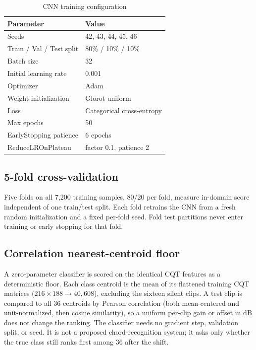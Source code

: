 \documentclass[pdflatex,sn-mathphys-num,iicol]{sn-jnl}
\theoremstyle{thmstyleone}
\theoremstyle{thmstyletwo}
\theoremstyle{thmstylethree}
\begin{document}
\begin{table}[t]
\caption{CNN training configuration}\label{tab:cnn-training-config}
\begin{tabular}{@{}ll@{}}
\toprule
Parameter & Value \\
\midrule
Seeds & 42, 43, 44, 45, 46 \\
Train / Val / Test split & 80\% / 10\% / 10\% \\
Batch size & 32 \\
Initial learning rate & 0.001 \\
Optimizer & Adam \\
Weight initialization & Glorot uniform \\
Loss & Categorical cross-entropy \\
Max epochs & 50 \\
EarlyStopping patience & 6 epochs \\
ReduceLROnPlateau & factor 0.1, patience 2 \\
\bottomrule
\end{tabular}
\end{table}

\subsection{5-fold cross-validation}\label{subsec3_5}

Five folds on all 7{,}200 training samples, 80/20 per fold, measure in-domain score independent of one train/test split. Each fold retrains the CNN from a fresh random initialization and a fixed per-fold seed. Fold test partitions never enter training or early stopping for that fold.

\subsection{Correlation nearest-centroid floor}\label{subsec3_baseline}

A zero-parameter classifier is scored on the identical CQT features as a deterministic floor. Each class centroid is the mean of its flattened training CQT matrices ($216\times188 \to 40{,}608$), excluding the sixteen silent clips. A test clip is compared to all 36 centroids by Pearson correlation (both mean-centered and unit-normalized, then cosine similarity), so a uniform per-clip gain or offset in dB does not change the ranking. The classifier needs no gradient step, validation split, or seed. It is not a proposed chord-recognition system; it asks only whether the true class still ranks first among 36 after the shift.
\end{document}
